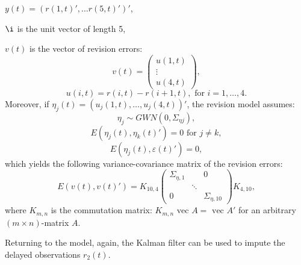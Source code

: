 \documentclass[8pt, a4paper, twocolumn, landscape]{extarticle}
\begin{document}
$y(t) = \left(r(1,t)', \dots r(5,t)' \right)'$,

$\i$ is the unit vector of length 5,

$v(t)$ is the vector of revision errors:
\[
v(t) = \begin{pmatrix}
u(1, t) \\
\vdots \\
u(4, t)
\end{pmatrix},
\]
\[
u(i, t) = r(i, t) - r(i + 1, t), \text{ for } i = 1, \dots, 4.
\]
Moreover, if $\eta_j(t) = (u_j(1, t), \dots, u_j(4, t))'$, the revision model assumes:
\[
\eta_j \sim GWN(0, \Sigma_{\eta j}),
\]
\[
E(\eta_j(t), \eta_k(t)') = 0 \text{ for } j \ne k,
\]
\[
E(\eta_j(t), \varepsilon(t)') = 0,
\]
which yields the following variance-covariance matrix of the revision errors:
\[
E(v(t),v(t)') = K_{10, 4} \begin{pmatrix}
\Sigma_{\eta, 1} & \, & 0 \\
\, & \ddots & \, \\
0 & \, & \Sigma_{\eta, 10}
\end{pmatrix} K_{4, 10},
\]
where $K_{m, n}$ is the commutation matrix: $K_{m,n} \text{ vec } A = \text{ vec } A'$ for an arbitrary $(m \times n)$-matrix $A$.

Returning to the model, again, the Kalman filter can be used to impute the delayed observations $r_2(t)$.
\end{document}
